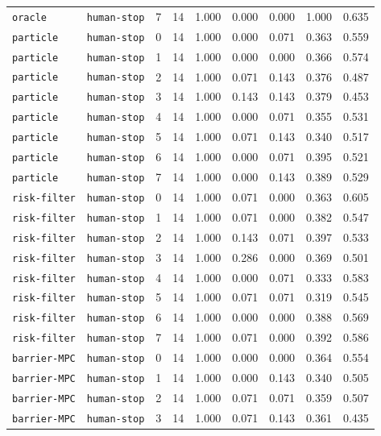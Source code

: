 \documentclass{article}
\begin{document}
\begin{center}
{\begin{tabular}{llllccccc}
\texttt{oracle} & \texttt{human-stop} & 7 & 14 & 1.000 & 0.000 & 0.000 & 1.000 & 0.635 \\
\texttt{particle} & \texttt{human-stop} & 0 & 14 & 1.000 & 0.000 & 0.071 & 0.363 & 0.559 \\
\texttt{particle} & \texttt{human-stop} & 1 & 14 & 1.000 & 0.000 & 0.000 & 0.366 & 0.574 \\
\texttt{particle} & \texttt{human-stop} & 2 & 14 & 1.000 & 0.071 & 0.143 & 0.376 & 0.487 \\
\texttt{particle} & \texttt{human-stop} & 3 & 14 & 1.000 & 0.143 & 0.143 & 0.379 & 0.453 \\
\texttt{particle} & \texttt{human-stop} & 4 & 14 & 1.000 & 0.000 & 0.071 & 0.355 & 0.531 \\
\texttt{particle} & \texttt{human-stop} & 5 & 14 & 1.000 & 0.071 & 0.143 & 0.340 & 0.517 \\
\texttt{particle} & \texttt{human-stop} & 6 & 14 & 1.000 & 0.000 & 0.071 & 0.395 & 0.521 \\
\texttt{particle} & \texttt{human-stop} & 7 & 14 & 1.000 & 0.000 & 0.143 & 0.389 & 0.529 \\
\texttt{risk-filter} & \texttt{human-stop} & 0 & 14 & 1.000 & 0.071 & 0.000 & 0.363 & 0.605 \\
\texttt{risk-filter} & \texttt{human-stop} & 1 & 14 & 1.000 & 0.071 & 0.000 & 0.382 & 0.547 \\
\texttt{risk-filter} & \texttt{human-stop} & 2 & 14 & 1.000 & 0.143 & 0.071 & 0.397 & 0.533 \\
\texttt{risk-filter} & \texttt{human-stop} & 3 & 14 & 1.000 & 0.286 & 0.000 & 0.369 & 0.501 \\
\texttt{risk-filter} & \texttt{human-stop} & 4 & 14 & 1.000 & 0.000 & 0.071 & 0.333 & 0.583 \\
\texttt{risk-filter} & \texttt{human-stop} & 5 & 14 & 1.000 & 0.071 & 0.071 & 0.319 & 0.545 \\
\texttt{risk-filter} & \texttt{human-stop} & 6 & 14 & 1.000 & 0.000 & 0.000 & 0.388 & 0.569 \\
\texttt{risk-filter} & \texttt{human-stop} & 7 & 14 & 1.000 & 0.071 & 0.000 & 0.392 & 0.586 \\
\texttt{barrier-MPC} & \texttt{human-stop} & 0 & 14 & 1.000 & 0.000 & 0.000 & 0.364 & 0.554 \\
\texttt{barrier-MPC} & \texttt{human-stop} & 1 & 14 & 1.000 & 0.000 & 0.143 & 0.340 & 0.505 \\
\texttt{barrier-MPC} & \texttt{human-stop} & 2 & 14 & 1.000 & 0.071 & 0.071 & 0.359 & 0.507 \\
\texttt{barrier-MPC} & \texttt{human-stop} & 3 & 14 & 1.000 & 0.071 & 0.143 & 0.361 & 0.435 \\
\bottomrule
\end{tabular}%
}
\end{center}
\end{document}
